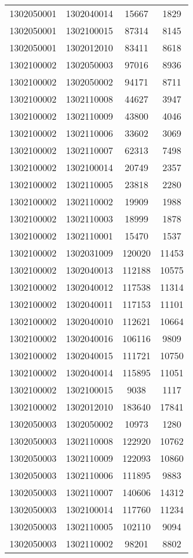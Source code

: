 \begin{longtable}{llcc}
1302050001 & 1302040014 & 15667 & 1829\\
1302050001 & 1302100015 & 87314 & 8145\\
1302050001 & 1302012010 & 83411 & 8618\\
1302100002 & 1302050003 & 97016 & 8936\\
1302100002 & 1302050002 & 94171 & 8711\\
1302100002 & 1302110008 & 44627 & 3947\\
1302100002 & 1302110009 & 43800 & 4046\\
1302100002 & 1302110006 & 33602 & 3069\\
1302100002 & 1302110007 & 62313 & 7498\\
1302100002 & 1302100014 & 20749 & 2357\\
1302100002 & 1302110005 & 23818 & 2280\\
1302100002 & 1302110002 & 19909 & 1988\\
1302100002 & 1302110003 & 18999 & 1878\\
1302100002 & 1302110001 & 15470 & 1537\\
1302100002 & 1302031009 & 120020 & 11453\\
1302100002 & 1302040013 & 112188 & 10575\\
1302100002 & 1302040012 & 117538 & 11314\\
1302100002 & 1302040011 & 117153 & 11101\\
1302100002 & 1302040010 & 112621 & 10664\\
1302100002 & 1302040016 & 106116 & 9809\\
1302100002 & 1302040015 & 111721 & 10750\\
1302100002 & 1302040014 & 115895 & 11051\\
1302100002 & 1302100015 & 9038 & 1117\\
1302100002 & 1302012010 & 183640 & 17841\\
1302050003 & 1302050002 & 10973 & 1280\\
1302050003 & 1302110008 & 122920 & 10762\\
1302050003 & 1302110009 & 122093 & 10860\\
1302050003 & 1302110006 & 111895 & 9883\\
1302050003 & 1302110007 & 140606 & 14312\\
1302050003 & 1302100014 & 117760 & 11234\\
1302050003 & 1302110005 & 102110 & 9094\\
1302050003 & 1302110002 & 98201 & 8802\\

\end{longtable}
